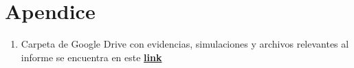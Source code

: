 \section{Apendice}
\begin{enumerate}
    \item Carpeta de Google Drive con evidencias, simulaciones y archivos relevantes al informe se encuentra en este \href{https://drive.google.com/drive/folders/1urglx7gSEKhbGuTpEY-z4wKpvm9DVZBm?usp=sharing}{\textbf{link}}
\end{enumerate}